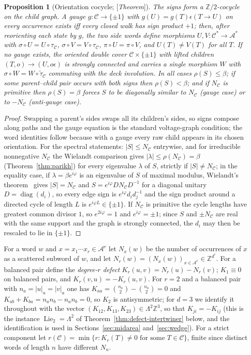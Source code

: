 \documentclass[11pt]{amsart}
\theoremstyle{plain}
\newtheorem{proposition}[theorem]{Proposition}
\theoremstyle{definition}
\theoremstyle{remark}
\newcommand{\Z}{\mathbb{Z}}
\newcommand{\A}{\mathcal{A}}
\newcommand{\cC}{\mathcal{C}}
\newcommand{\Lie}{\operatorname{Lie}}
\newcommand{\Status}[1]{\textup{[\textit{#1}]}}
\begin{document}
\begin{proposition}[Orientation cocycle; \Status{Theorem}]\label{prop:cocycle}
The signs form a $\Z/2$-cocycle on the child graph. A \emph{gauge} $g:\cC\to\{\pm1\}$ with $g(U)=g(T)\epsilon(T\to U)$ on every occurrence exists iff every closed walk has sign product $+1$; then, after reorienting each state by $g$, the two side words define morphisms $U,V:\cC^*\to\A^*$ with $\sigma\circ U=U\circ\tau_\cC$, $\sigma\circ V=V\circ\tau_\cC$, $\pi\circ U=\pi\circ V$, and $U(T)\ne V(T)$ for all $T$. If no gauge exists, the oriented double cover $\cC\times\{\pm1\}$ with lifted children $(T,o)\to(U,o\epsilon)$ is strongly connected and carries a single morphism $W$ with $\sigma\circ W=W\circ\tilde\tau_\cC$ commuting with the deck involution. In all cases $\rho(S)\le\beta$; if some parent--child pair occurs with both signs then $\rho(S)<\beta$; and if $N_\cC$ is primitive then $\rho(S)=\beta$ forces $S$ to be diagonally similar to $N_\cC$ (gauge case) or to $-N_\cC$ (anti-gauge case).
\end{proposition}
\begin{proof}
Swapping a parent's sides swaps all its children's sides, so signs compose along paths and the gauge equation is the standard voltage-graph condition; the word identities follow because with a gauge every raw child appears in its chosen orientation. For the spectral statements: $|S|\le N_\cC$ entrywise, and for irreducible nonnegative $N_\cC$ the Wielandt comparison gives $|\lambda|\le\rho(N_\cC)=\beta$ (Theorem~\ref{thm:parikh}) for every eigenvalue $\lambda$ of $S$, strictly if $|S|\ne N_\cC$; in the equality case, if $\lambda=\beta e^{i\varphi}$ is an eigenvalue of $S$ of maximal modulus, Wielandt's theorem~\cite[Thm.~8.4.5]{HornJohnson} gives $|S|=N_\cC$ and $S=e^{i\varphi}DN_\cC D^{-1}$ for a diagonal unitary $D=\operatorname{diag}(d_i)$, so every edge sign is $e^{i\varphi}d_id_j^{-1}$ and the sign product around a directed cycle of length $L$ is $e^{i\varphi L}\in\{\pm1\}$. If $N_\cC$ is primitive the cycle lengths have greatest common divisor $1$, so $e^{2i\varphi}=1$ and $e^{i\varphi}=\pm1$; since $S$ and $\pm N_\cC$ are real with the same support and the graph is strongly connected, the $d_i$ may then be rescaled to lie in $\{\pm1\}$.
\end{proof}

For a word $w$ and $x=x_1\cdots x_r\in\A^r$ let $N_x(w)$ be the number of occurrences of $x$ as a scattered subword of $w$, and let $N_r(w)=(N_x(w))_{x\in\A^r}\in\Z^{d^r}$. For a balanced pair define the \emph{degree-$r$ defect} $K_r(u,v)=N_r(u)-N_r(v)$; $K_1\equiv0$ on balanced pairs, and $K_r(v,u)=-K_r(u,v)$. For $r=2$ and a balanced pair with $n_a=|u|_a=|v|_a$ one has $K_{aa}=\binom{n_a}2-\binom{n_a}2=0$ and $K_{ab}+K_{ba}=n_an_b-n_an_b=0$, so $K_2$ is antisymmetric; for $d=3$ we identify it throughout with the vector $(K_{12},K_{13},K_{23})\in\Lambda^2\Z^3$, so that $K_{ji}=-K_{ij}$ (this is the instance $\Lie_2=\Lambda^2$ of Theorem~\ref{thm:defect-intertwiner} below, and the identification is used in Sections~\ref{sec:midarea} and~\ref{sec:wedge}). For a strict component let $r(\cC)=\min\{r:K_r(T)\ne0\text{ for some }T\in\cC\}$, finite since distinct words of length $n$ have different $N_n$.
\end{document}

